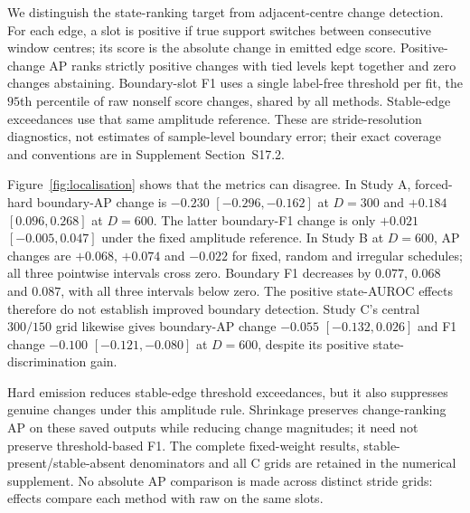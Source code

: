 We distinguish the state-ranking target from adjacent-centre change detection.
For each edge, a slot is positive if true support switches between consecutive
window centres; its score is the absolute change in emitted edge score.
Positive-change AP ranks strictly positive changes with tied levels kept
together and zero changes abstaining. Boundary-slot F1 uses a single
label-free threshold per fit, the $95$th percentile of raw nonself score
changes, shared by all methods. Stable-edge exceedances use that same
amplitude reference. These are stride-resolution diagnostics, not estimates
of sample-level boundary error; their exact coverage and conventions are in
Supplement Section~S17.2.

Figure~\ref{fig:localisation} shows that the metrics can disagree.
In Study A, forced-hard boundary-AP change is $-0.230$
$[-0.296,-0.162]$ at $D=300$ and $+0.184$ $[0.096,0.268]$
at $D=600$. The latter boundary-F1 change is only $+0.021$
$[-0.005,0.047]$ under the fixed amplitude reference.
In Study B at $D=600$, AP changes are $+0.068$, $+0.074$ and
$-0.022$ for fixed, random and irregular schedules; all three pointwise
intervals cross zero. Boundary F1 decreases by $0.077$, $0.068$ and
$0.087$, with all three intervals below zero. The positive state-AUROC
effects therefore do not establish improved boundary detection. Study C's
central $300/150$ grid likewise gives boundary-AP change $-0.055$
$[-0.132,0.026]$ and F1 change $-0.100$ $[-0.121,-0.080]$ at $D=600$,
despite its positive state-discrimination gain.

Hard emission reduces stable-edge threshold exceedances, but it also
suppresses genuine changes under this amplitude rule. Shrinkage preserves
change-ranking AP on these saved outputs while reducing change magnitudes;
it need not preserve threshold-based F1. The complete fixed-weight results,
stable-present/stable-absent denominators and all C grids are retained in
the numerical supplement. No absolute AP comparison is made across distinct
stride grids: effects compare each method with raw on the same slots.
